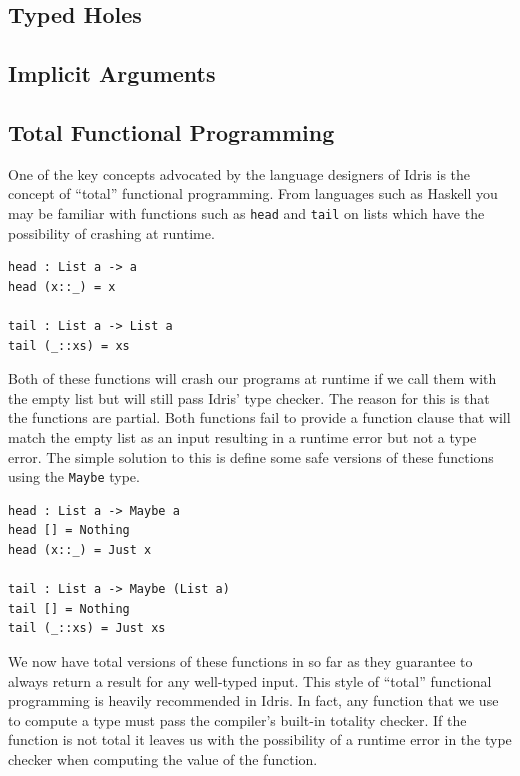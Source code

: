 \documentclass[a4paper, notitlepage]{report}
\begin{document}
\subsection{Typed Holes}
\label{sec:org5107f3c}

\subsection{Implicit Arguments}
\label{sec:org3a63da2}

\subsection{Total Functional Programming}
\label{sec:org6f3b2a7}
One of the key concepts advocated by the language designers of Idris is the
concept of ``total'' functional programming. From languages such as Haskell you
may be familiar with functions such as \texttt{head} and \texttt{tail} on lists which have the
possibility of crashing at runtime.

\begin{verbatim}
head : List a -> a
head (x::_) = x

tail : List a -> List a
tail (_::xs) = xs
\end{verbatim}

Both of these functions will crash our programs at runtime if we call them with
the empty list but will still pass Idris' type checker. The reason for this is
that the functions are partial. Both functions fail to provide a function clause
that will match the empty list as an input resulting in a runtime error but not
a type error. The simple solution to this is define some safe versions of these
functions using the \texttt{Maybe} type.

\begin{verbatim}
head : List a -> Maybe a
head [] = Nothing
head (x::_) = Just x

tail : List a -> Maybe (List a)
tail [] = Nothing
tail (_::xs) = Just xs
\end{verbatim}

We now have total versions of these functions in so far as they guarantee to
always return a result for any well-typed input. This style of ``total''
functional programming is heavily recommended in Idris. In fact, any function
that we use to compute a type must pass the compiler's built-in totality
checker. If the function is not total it leaves us with the possibility of a
runtime error in the type checker when computing the value of the function.
\end{document}
